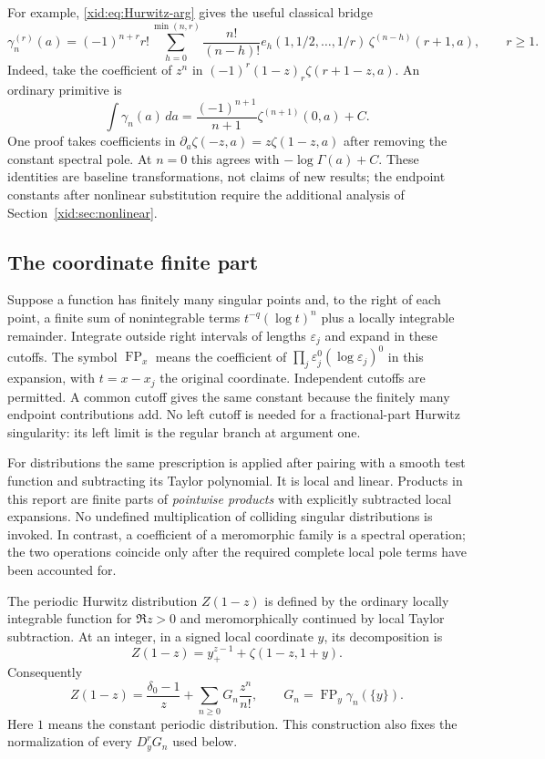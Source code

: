 \documentclass[11pt,a4paper]{article}
\numberwithin{equation}{section}
\theoremstyle{definition}
\theoremstyle{remark}
\DeclareMathOperator{\FP}{FP}
\begin{document}
For example, \eqref{xid:eq:Hurwitz-arg} gives the useful classical bridge
\begin{equation}\label{xid:eq:Stieltjes-arg-zeta}
 \gamma_n^{(r)}(a)=(-1)^{n+r}r!
 \sum_{h=0}^{\min(n,r)}\frac{n!}{(n-h)!}
 e_h(1,1/2,\ldots,1/r)\,
       \zeta^{(n-h)}(r+1,a),\qquad r\ge1.
\end{equation}
Indeed, take the coefficient of $z^n$ in
$(-1)^r(1-z)_r\zeta(r+1-z,a)$. An ordinary primitive is
\begin{equation}\label{xid:eq:ordinary-Stieltjes-primitive}
 \int\gamma_n(a)\,da
       =\frac{(-1)^{n+1}}{n+1}\zeta^{(n+1)}(0,a)+C.
\end{equation}
One proof takes coefficients in
$\partial_a\zeta(-z,a)=z\zeta(1-z,a)$ after removing the constant
spectral pole. At $n=0$ this agrees with $-\log\Gamma(a)+C$.
These identities are baseline transformations, not claims of new
results; the endpoint constants after nonlinear substitution require
the additional analysis of Section~\ref{xid:sec:nonlinear}.

\subsection{The coordinate finite part}

Suppose a function has finitely many singular points and, to the right
of each point, a finite sum of nonintegrable terms
$t^{-q}(\log t)^n$ plus a locally integrable remainder. Integrate
outside right intervals of lengths $\varepsilon_j$ and expand in these
cutoffs. The symbol $\FP_x$ means the coefficient of
$\prod_j\varepsilon_j^0(\log\varepsilon_j)^0$ in this expansion,
with $t=x-x_j$ the original coordinate. Independent cutoffs are
permitted. A common cutoff gives the same constant because the finitely
many endpoint contributions add. No left cutoff is needed for a
fractional-part Hurwitz singularity: its left limit is the regular
branch at argument one.

For distributions the same prescription is applied after pairing with
a smooth test function and subtracting its Taylor polynomial. It is
local and linear. Products in this report are finite parts of
\emph{pointwise products} with explicitly subtracted local expansions.
No undefined multiplication of colliding singular distributions is
invoked. In contrast, a coefficient of a meromorphic family is a
spectral operation; the two operations coincide only after the required
complete local pole terms have been accounted for.

The periodic Hurwitz distribution $Z(1-z)$ is defined by the ordinary
locally integrable function for $\Re z>0$ and meromorphically continued
by local Taylor subtraction. At an integer, in a signed local
coordinate $y$, its decomposition is
\[
 Z(1-z)=y_+^{z-1}+\zeta(1-z,1+y).
\]
Consequently
\begin{equation}\label{xid:eq:canonical-periodic}
 Z(1-z)=\frac{\delta_0-1}{z}
       +\sum_{n\ge0}G_n\frac{z^n}{n!},
 \qquad G_n=\FP_y\gamma_n(\{y\}).
\end{equation}
Here $1$ means the constant periodic distribution. This construction
also fixes the normalization of every $D_y^rG_n$ used below.
\end{document}
